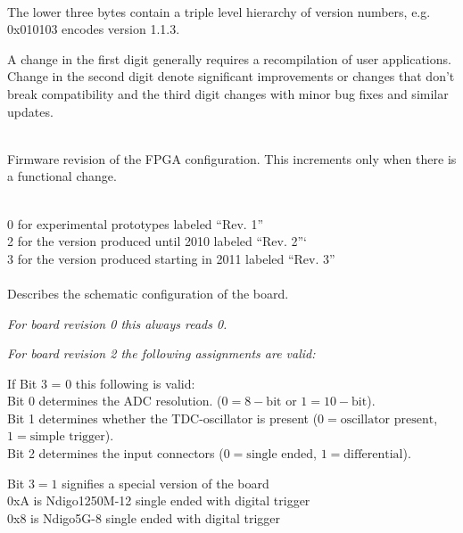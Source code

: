             \\
            The lower three bytes contain a triple level hierarchy of version numbers, e.g. 0x010103 encodes version 1.1.3.\par

            A change in the first digit generally requires a recompilation of user applications. Change in the second digit denote significant improvements or changes that don't break compatibility and the third digit changes with minor bug fixes and similar updates.\par

            \\
            Firmware revision of the FPGA configuration. This increments only when there is a functional change.\par

            \\
            0 for experimental prototypes labeled ``Rev. 1''\\
            2 for the version produced until 2010 labeled ``Rev. 2''`\\
            3 for the version produced starting in 2011 labeled ``Rev. 3''\\

            \\
            Describes the schematic configuration of the board.\par

            \noindent\textit{For board revision 0 this always reads 0.}\par

            \noindent\textit{For board revision 2 the following assignments are valid:}\par

            \noindent If Bit 3 = 0 this following is valid:\\
            Bit 0 determines the ADC resolution. ($0 = 8-\text{bit}$ or $1 = 10-\text{bit}$).\\
            Bit 1 determines whether the TDC-oscillator is present ($0 = \text{oscillator present}$, $1 = \text{simple trigger}$).\\
            Bit 2 determines the input connectors ($0 = \text{single ended}$, $1 = \text{differential}$).\par

            \noindent Bit $3 = 1$ signifies a special version of the board\\
            0xA is Ndigo1250M-12 single ended with digital trigger\\
            0x8 is Ndigo5G-8 single ended with digital trigger\par

